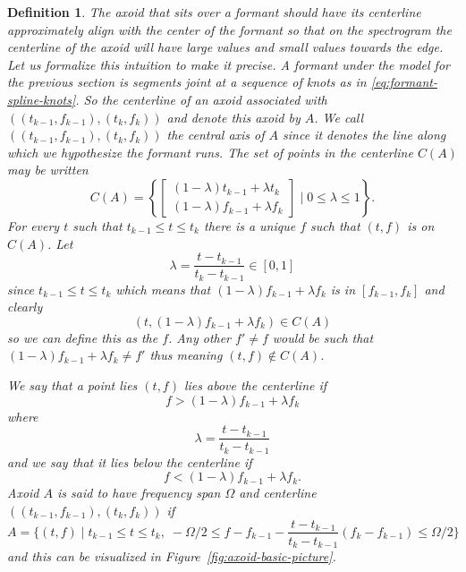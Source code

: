 \documentclass[english]{article}
\newtheorem{defn}{Definition}[section]
\begin{document}
\begin{defn}
The axoid that sits over a formant should have its centerline
approximately align with the center of the formant so that on
the spectrogram the centerline of the axoid will have large values
and small values towards the edge.  Let us formalize this
intuition to make it precise.  A formant under the model for
the previous section is segments joint at a sequence of knots
as in \autoref{eq:formant-spline-knots}.  So the centerline
of an axoid associated with $((t_{k-1},f_{k-1}),(t_k,f_k))$
and denote this axoid by $A$.  We call $((t_{k-1},f_{k-1}),(t_k,f_k))$
the \textit{central axis} of $A$ since it denotes the line along
which we hypothesize the formant runs.  The set of points in the
centerline $C(A)$ may be written
\begin{equation}\label{eq:centerline-axoid-def}
C(A) = \left\{ \begin{bmatrix}(1-\lambda) t_{k-1} + \lambda t_k\\ 
(1-\lambda) f_{k-1} + \lambda f_k\end{bmatrix}\mid 0\leq \lambda\leq 1\right\}.
\end{equation}
For every $t$ such that $t_{k-1}\leq t\leq t_{k}$ there is a unique $f$
such that $(t,f)$ is on $C(A)$. Let 
\begin{equation}
\lambda = \frac{t-t_{k-1}}{t_k-t_{k-1}}\in [0,1]
\end{equation}
since $t_{k-1}\leq t\leq t_k$ which means that
$(1-\lambda )f_{k-1} + \lambda f_k$ is in $[f_{k-1},f_k]$
and clearly 
\begin{equation}
(t,(1-\lambda )f_{k-1} + \lambda f_k) \in C(A)
\end{equation}
so we can define this as the $f$.  Any other $f'\neq f$
would be such that $(1-\lambda)f_{k-1}+\lambda f_k\neq f'$ thus 
meaning $(t,f)\not\in C(A)$.

We say that a point lies $(t,f)$ lies above the centerline if
\begin{equation}
f > (1-\lambda )f_{k-1} + \lambda f_k
\end{equation}
where
\begin{equation}
\lambda = \frac{t-t_{k-1}}{t_k-t_{k-1}}
\end{equation}
and we say that it lies below the centerline if
\begin{equation}
f < (1-\lambda )f_{k-1} + \lambda f_k.
\end{equation}
Axoid $A$ is said to have frequency span $\Omega$ and centerline
$((t_{k-1},f_{k-1}),(t_k,f_k))$ if
\begin{equation}\label{eq:axoid-set-definition}
A = \{ (t,f)\mid t_{k-1}\leq t\leq t_k,\; -\Omega/2\leq f - f_{k-1} - \frac{t-t_{k-1}}{t_k-t_{k-1}}(f_k-f_{k-1})\leq \Omega/2\}
\end{equation}
and this can be visualized in Figure~\ref{fig:axoid-basic-picture}.
\begin{figure}
\centering
{}
\end{figure}
\end{defn}
\end{document}
